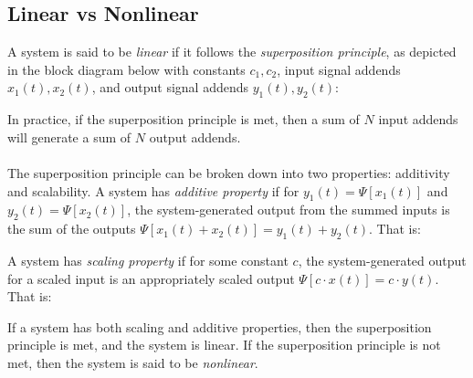 \documentclass{report}
\begin{document}
\subsection{Linear vs Nonlinear}
A system is said to be \emph{linear} if it follows the \emph{superposition principle}, as depicted in the block diagram below with constants $c_1,c_2$, input signal 
addends $x_1(t), x_2(t)$, and output signal addends $y_1(t),y_2(t)$:
\begin{center}
\end{center}
In practice, if the superposition principle is met, then a sum of $N$ input addends will generate a sum of $N$ output addends. \\ \\
The superposition principle can be broken down into two properties: additivity and scalability. 
A system has \emph{additive property} if for $y_1(t)=\Psi[x_1(t)]$ and $y_2(t)=\Psi[x_2(t)]$, the system-generated output from 
the summed inputs is the sum of the outputs $\Psi[x_1(t)+x_2(t)]=y_1(t)+y_2(t)$. That is:
\begin{center}
\end{center}
A system has \emph{scaling property} if for some constant $c$, the system-generated output for a scaled input is 
an appropriately scaled output $\Psi[c\cdot x(t)]=c\cdot y(t)$. That is:
\begin{center}
\end{center}
If a system has both scaling and additive properties, then the superposition principle is met, and the system is linear. If the superposition principle is not met, 
then the system is said to be \emph{nonlinear}.
\end{document}
